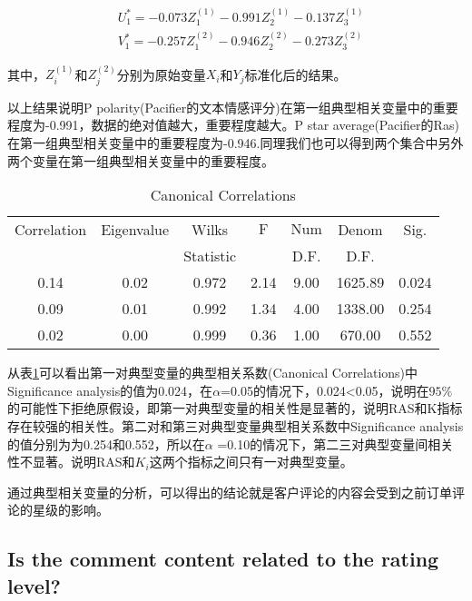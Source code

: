 \documentclass[UTF8]{article}
\begin{document}
\[\begin{aligned}
&U_{1}^{*}=-0.073 Z_{1}^{(1)}-0.991 Z_{2}^{(1)}-0.137 Z_{3}^{(1)}\\
&V_{1}^{*}=-0.257 Z_{1}^{(2)}-0.946 Z_{2}^{(2)}-0.273 Z_{3}^{(2)}
\end{aligned}\]

其中，\(Z_{i}^{(1)}\)和\(Z_{j}^{(2)}\)分别为原始变量\(X_{i}\)和\(Y_{j}\)标准化后的结果。

以上结果说明P polarity(Pacifier的文本情感评分)在第一组典型相关变量中的重要程度为-0.991，数据的绝对值越大，重要程度越大。P star average(Pacifier的Ras)在第一组典型相关变量中的重要程度为-0.946.同理我们也可以得到两个集合中另外两个变量在第一组典型相关变量中的重要程度。

\begin{table}[H]
	\centering
	\caption{Canonical Correlations}\label{q4b2}
	\begin{tabular}{ccccccc}
		\hline  Correlation & Eigenvalue & Wilks  & $\mathrm{F}$ & $\mathrm{Num} $ & Denom  & Sig. \\
		&  &  Statistic &  & D.F. &  D.F. &  \\
		\hline  0.14 & 0.02 & 0.972 & 2.14 & 9.00 & 1625.89 & 0.024 \\
		0.09 & 0.01 & 0.992 & 1.34 & 4.00 & 1338.00 & 0.254 \\
		0.02 & 0.00 & 0.999 & 0.36 & 1.00 & 670.00 & 0.552 \\
		\hline
	\end{tabular}
\end{table}

从表\ref{q4b2}可以看出第一对典型变量的典型相关系数(Canonical Correlations)中Significance analysis的值为0.024，在\(\alpha\)=0.05的情况下，0.024<0.05，说明在\(95 \%\)的可能性下拒绝原假设，即第一对典型变量的相关性是显著的，说明RAS和K指标存在较强的相关性。第二对和第三对典型变量典型相关系数中Significance analysis的值分别为为0.254和0.552，所以在\(\alpha\) =0.10的情况下，第二三对典型变量间相关性不显著。说明RAS和\(K_{i}\)这两个指标之间只有一对典型变量。

通过典型相关变量的分析，可以得出的结论就是客户评论的内容会受到之前订单评论的星级的影响。

\subsection{ Is the comment content  related to the rating level?}
\end{document}
